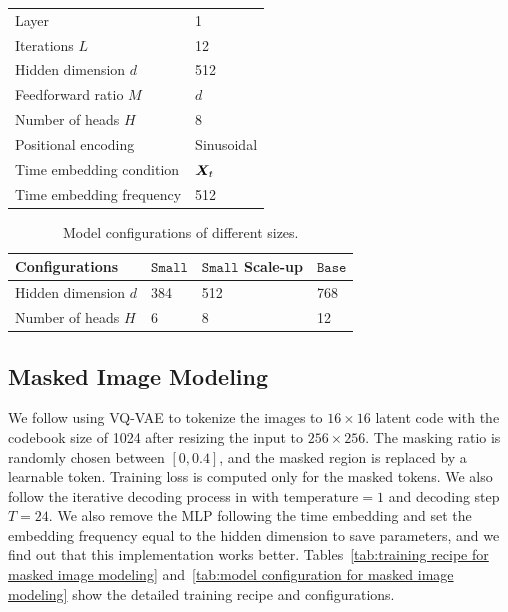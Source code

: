 \begin{table}[htbp]
\begin{minipage}[t]{0.49\textwidth}
\begin{tabular}{ll}
            Layer  &  1 \\
            Iterations $L$ & 12 \\
            Hidden dimension $d$ & 512 \\
            Feedforward ratio $M$ & $d$ \\
            Number of heads $H$ & 8 \\
            Positional encoding & Sinusoidal\\
            Time embedding condition & ${\bm{X}}_t$ \\
            Time embedding frequency & 512 \\
            \bottomrule
        \end{tabular}
    \end{minipage}
\end{table}

\begin{table}[htbp]
\caption{Model configurations of different sizes.}
\label{tab:scaling modeling configuration}
\centering
\begin{tabular}{llll}
\toprule
\textbf{Configurations}  &  $\texttt{Small}$ & $\texttt{Small}$ Scale-up & $\texttt{Base}$\\
\midrule
Hidden dimension $d$  & 384 & 512 & 768 \\
Number of heads $H$  & 6 & 8 & 12 \\
\bottomrule
\end{tabular}

\end{table}


\subsection{Masked Image Modeling}
\label{section:masked image modeling setup}

We follow \citet{chang2022maskgit} using VQ-VAE to tokenize the images to $16\times16$ latent code with the codebook size of 1024 after resizing the input to $256\times256$. The masking ratio is randomly chosen between $[0,0.4]$, and the masked region is replaced by a learnable token. Training loss is computed only for the masked tokens. We also follow the iterative decoding process in \citet{chang2022maskgit} with $\text{temperature}=1$ and decoding step $T=24$. We also remove the MLP following the time embedding and set the embedding 
 frequency equal to the hidden dimension to save parameters, and we find out that this implementation works better. Tables~\ref{tab:training recipe for masked image modeling} and~\ref{tab:model configuration for masked image modeling} show the detailed training recipe and configurations.

